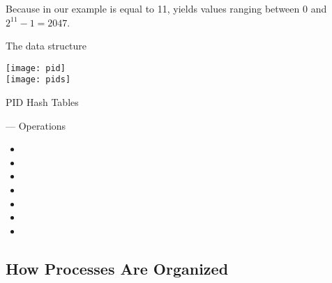 Because in our example  is equal to 11,  yields
values ranging between $0$ and $2^{11} - 1 = 2047$.

\begin{frame}
  \begin{block}{The  data structure}
    \begin{multicols}{2}
      \texttt{[image: pid]}\\
      \texttt{[image: pids]}
    \end{multicols}
  \end{block}
\end{frame}

\begin{frame}{PID Hash Tables}
  \begin{center}
  \end{center}
\end{frame}

\begin{frame}
  \begin{block}{ --- Operations}
    \begin{itemize}
    \item {}
    \item {}
    \item {}
    \item {}
    \item {}
    \item {}
    \item {}
    \end{itemize}
  \end{block}
\end{frame}

\subsection{How Processes Are Organized}


